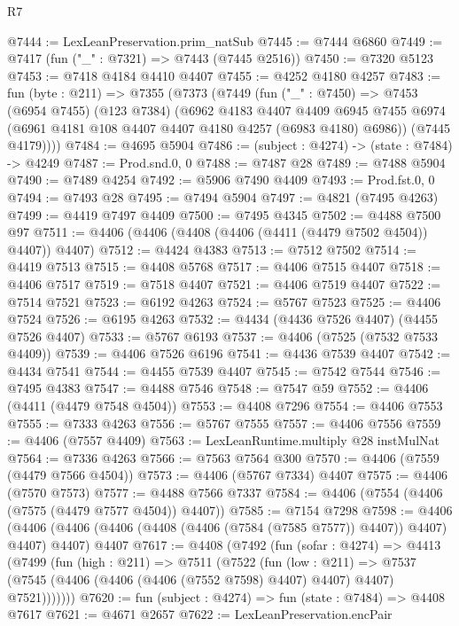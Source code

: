 \begin{lexlean}{R7}
\begin{coremodule}
@7444 := LexLeanPreservation.prim_natSub
@7445 := @7444 @6860
@7449 := @7417 (fun ("_" : @7321) => @7443 (@7445 @2516))
@7450 := @7320 @5123
@7453 := @7418 @4184 @4410 @4407
@7455 := @4252 @4180 @4257
@7483 := fun (byte : @211) =>
  @7355
    (@7373
      (@7449
        (fun ("_" : @7450) =>
        @7453
          (@6954 @7455)
          (@123 @7384)
          (@6962
            @4183
            @4407
            @4409
            @6945
            @7455
            @6974
            (@6961 @4181 @108 @4407 @4407 @4180 @4257 (@6983 @4180) @6986))
          (@7445 @4179))))
@7484 := @4695 @5904
@7486 := (subject : @4274) -> (state : @7484) -> @4249
@7487 := Prod.snd.{0, 0}
@7488 := @7487 @28
@7489 := @7488 @5904
@7490 := @7489 @4254
@7492 := @5906 @7490 @4409
@7493 := Prod.fst.{0, 0}
@7494 := @7493 @28
@7495 := @7494 @5904
@7497 := @4821 (@7495 @4263)
@7499 := @4419 @7497 @4409
@7500 := @7495 @4345
@7502 := @4488 @7500 @97
@7511 := @4406 (@4406 (@4408 (@4406 (@4411 (@4479 @7502 @4504)) @4407)) @4407)
@7512 := @4424 @4383
@7513 := @7512 @7502
@7514 := @4419 @7513
@7515 := @4408 @5768
@7517 := @4406 @7515 @4407
@7518 := @4406 @7517
@7519 := @7518 @4407
@7521 := @4406 @7519 @4407
@7522 := @7514 @7521
@7523 := @6192 @4263
@7524 := @5767 @7523
@7525 := @4406 @7524
@7526 := @6195 @4263
@7532 := @4434 (@4436 @7526 @4407) (@4455 @7526 @4407)
@7533 := @5767 @6193
@7537 := @4406 (@7525 (@7532 @7533 @4409))
@7539 := @4406 @7526 @6196
@7541 := @4436 @7539 @4407
@7542 := @4434 @7541
@7544 := @4455 @7539 @4407
@7545 := @7542 @7544
@7546 := @7495 @4383
@7547 := @4488 @7546
@7548 := @7547 @59
@7552 := @4406 (@4411 (@4479 @7548 @4504))
@7553 := @4408 @7296
@7554 := @4406 @7553
@7555 := @7333 @4263
@7556 := @5767 @7555
@7557 := @4406 @7556
@7559 := @4406 (@7557 @4409)
@7563 := LexLeanRuntime.multiply @28 instMulNat
@7564 := @7336 @4263
@7566 := @7563 @7564 @300
@7570 := @4406 (@7559 (@4479 @7566 @4504))
@7573 := @4406 (@5767 @7334) @4407
@7575 := @4406 (@7570 @7573)
@7577 := @4488 @7566 @7337
@7584 := @4406 (@7554 (@4406 (@7575 (@4479 @7577 @4504)) @4407))
@7585 := @7154 @7298
@7598 := @4406
    (@4406 (@4406 (@4406 (@4408 (@4406 (@7584 (@7585 @7577)) @4407)) @4407) @4407) @4407)
    @4407
@7617 := @4408
    (@7492
      (fun (sofar : @4274) =>
      @4413
        (@7499
          (fun (high : @211) =>
          @7511
            (@7522
              (fun (low : @211) =>
              @7537 (@7545 (@4406 (@4406 (@4406 (@7552 @7598) @4407) @4407) @4407) @7521)))))))
@7620 := fun (subject : @4274) => fun (state : @7484) => @4408 @7617
@7621 := @4671 @2657
@7622 := LexLeanPreservation.encPair

\end{coremodule}
\end{lexlean}
